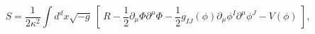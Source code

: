 \begin{equation}
S = \frac1{2\kappa^2}\int d^dx\sqrt{-g}\ \left[ \ R-\frac12\partial_\mu\Phi\partial^\mu\Phi
   -\frac12g_{IJ}(\phi)\partial_\mu\phi^I\partial^\mu\phi^J-V(\phi) \ \right],
\end{equation}

